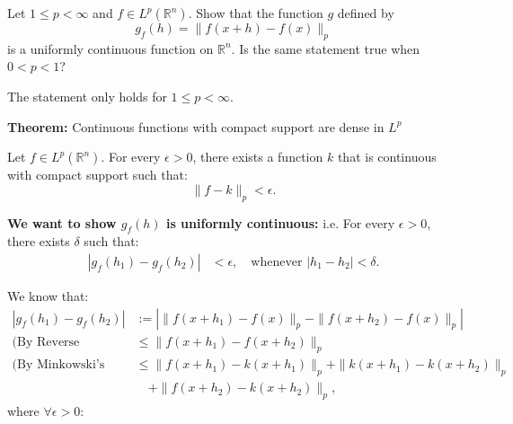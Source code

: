 \documentclass[UTF8,a4paper,10pt]{article}
\begin{document}
\pagebreak

\begin{Problem}[]{}
  Let \( 1 \leq p < \infty \) and \( f \in L^p(\mathbb{R}^n) \). Show that the function \( g \) defined by
  \[
  g_f(h) = \|f(x + h) - f(x)\|_p
  \]
  is a uniformly continuous function on \(\mathbb{R}^n\). Is the same statement true when \( 0 < p < 1 \)?
  

\end{Problem}


The statement only holds for \(1 \leq p < \infty\).

\textbf{Theorem:} Continuous functions with compact support are dense in \(L^p\)

Let \(f \in L^p(\mathbb{R}^n)\). For every \(\epsilon > 0\), there exists a function \(k\) that is continuous with compact support such that:
\[
\|f - k\|_p < \epsilon.
\]






\dotfill

\textbf{We want to show \(g_f(h)\) is uniformly continuous:} i.e. For every \(\epsilon > 0\), there exists \(\delta\) such that:
\begin{equation*}
  \begin{aligned}
    |g_f(h_1) - g_f(h_2)| &< \epsilon, \quad \text{whenever } |h_1 - h_2| < \delta.
  \end{aligned}
\end{equation*}

We know that:
\begin{equation*}
  \begin{aligned}
    |g_f(h_1) - g_f(h_2)|   &:= |\|f(x+h_1) - f(x)\|_p - \|f(x+h_2) - f(x)\|_p| \\
    \text{(By Reverse Triangle Inequality) }& \leq \|f(x+h_1) - f(x+h_2)\|_p \\
    \text{(By Minkowski's Inequality) }&\leq \|f(x+h_1) - k(x+h_1)\|_p + \|k(x+h_1) - k(x+h_2)\|_p \\
    &\quad + \|f(x+h_2) - k(x+h_2)\|_p,
  \end{aligned}
\end{equation*}
where \(\forall \epsilon>0:\)
\end{document}
